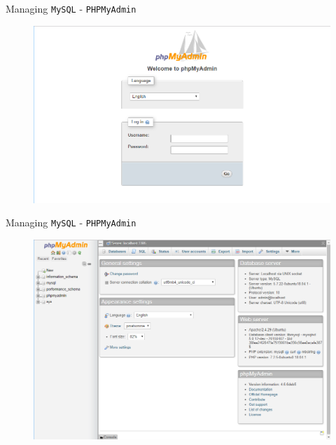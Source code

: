 \documentclass[xcolor=table]{beamer}
\begin{document}
\begin{frame}{Managing \texttt{MySQL} - \texttt{PHPMyAdmin}}
  \begin{figure}
    \begin{center}
      \includegraphics[width=1\linewidth]{PHPLogin.png}
    \end{center}
  \end{figure}
\end{frame}

\begin{frame}{Managing \texttt{MySQL} - \texttt{PHPMyAdmin}}
  \begin{figure}
    \begin{center}
      \includegraphics[width=0.9\linewidth]{PHPMyAdmin.png}
    \end{center}
  \end{figure}
\end{frame}
\end{document}
